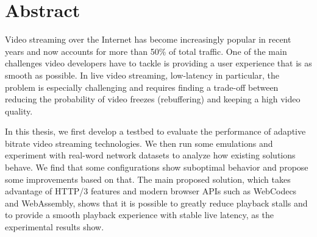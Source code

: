 \chapter*{Abstract} %
\label{abtract}


Video streaming over the Internet has become increasingly popular in recent years and now accounts for more than 50\% of total traffic. One of the main challenges video developers have to tackle is providing a user experience that is as smooth as possible. In live video streaming, low-latency in particular, the problem is especially challenging and requires finding a trade-off between reducing the probability of video freezes (rebuffering) and keeping a high video quality.

In this thesis, we first develop a testbed to evaluate the performance of adaptive bitrate video streaming technologies. We then run some emulations and experiment with real-word network datasets to analyze how existing solutions behave. We find that some configurations show suboptimal behavior and propose some improvements based on that. The main proposed solution, which takes advantage of HTTP/3 features and modern browser APIs such as WebCodecs and WebAssembly, shows that it is possible to greatly reduce playback stalls and to provide a smooth playback experience with stable live latency, as the experimental results show.

\newpage
